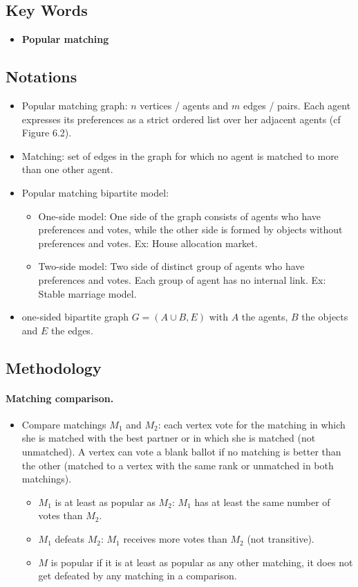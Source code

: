 \documentclass[12pt,a4paper]{article}
\begin{document}
\subsection*{Key Words}
\begin{itemize}
    \item \textbf{Popular matching}
\end{itemize}

\subsection*{Notations}
\begin{itemize}
    \item Popular matching graph: $n$ vertices / agents and $m$ edges / pairs. Each agent expresses its preferences as a strict ordered list over her adjacent agents (cf Figure 6.2).
    \item Matching: set of edges in the graph for which no agent is matched to more than one other agent.
    \item Popular matching bipartite model:
    \begin{itemize}
        \item One-side model: One side of the graph consists of agents who have preferences and votes, while the other side is formed by objects without preferences and votes. Ex: House allocation market.
        \item Two-side model: Two side of distinct group of agents who have preferences and votes. Each group of agent has no internal link. Ex: Stable marriage model.
    \end{itemize}
    \item one-sided bipartite graph $G = (A \cup B, E)$ with $A$ the agents, $B$ the objects and $E$ the edges.
\end{itemize}

\subsection*{Methodology}
\paragraph{Matching comparison.}
\begin{itemize}
    \item Compare matchings $M_1$ and $M_2$: each vertex vote for the matching in which she is matched with the best partner or in which she is matched (not unmatched). A vertex can vote a blank ballot if no matching is better than the other (matched to a vertex with the same rank or unmatched in both matchings).
    \begin{itemize}
        \item $M_1$ is at least as popular as $M_2$: $M_1$ has at least the same number of votes than $M_2$.
        \item $M_1$ defeats $M_2$: $M_1$ receives more votes than $M_2$ (not transitive).
        \item $M$ is popular if it is at least as popular as any other matching, it does not get defeated by any matching in a comparison.
    \end{itemize} 
\end{itemize}
\end{document}
